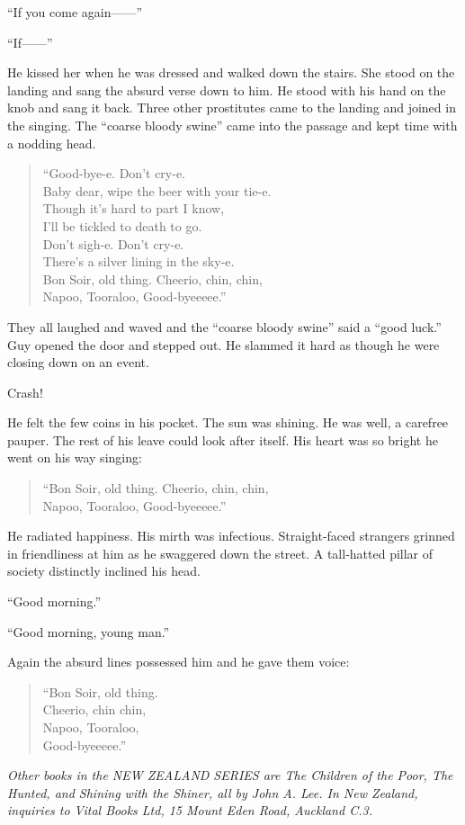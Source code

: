 ``If you come again------''

``If------''

He kissed her when he was dressed and walked down the stairs. She stood on the landing and sang the absurd verse down to him. He stood with his hand on the knob and sang it back. Three other prostitutes came to the landing and joined in the singing. The ``coarse bloody swine'' came into the passage and kept time with a nodding head.

\begin{verse}
``Good-bye-e. Don't cry-e.\\
Baby dear, wipe the beer with your tie-e.\\
Though it's hard to part I know,\\
I'll be tickled to death to go.\\
Don't sigh-e. Don't cry-e.\\
There's a silver lining in the sky-e.\\
Bon Soir, old thing. Cheerio, chin, chin,\\
Napoo, Tooraloo, Good-byeeeee.''\\
\end{verse}

They all laughed and waved and the ``coarse bloody swine'' said a ``good luck.'' Guy opened the door and stepped out. He slammed it hard as though he were closing down on an event.

Crash!

He felt the few coins in his pocket. The sun was shining. He was well, a carefree pauper. The rest of his leave could look after itself. His heart was so bright he went on his way singing:

\begin{verse}
``Bon Soir, old thing. Cheerio, chin, chin,\\
Napoo, Tooraloo, Good-byeeeee.''\\
\end{verse}

He radiated happiness. His mirth was infectious. Straight-faced strangers grinned in friendliness at him as he swaggered down the street. A tall-hatted pillar of society distinctly inclined his head.

``Good morning.''

``Good morning, young man.''

Again the absurd lines possessed him and he gave them voice:

\begin{verse}
``Bon Soir, old thing.\\
Cheerio, chin chin,\\
Napoo, Tooraloo,\\
Good-byeeeee.''\\
\end{verse}

\begin{flushright}
\textit{Other books in the NEW ZEALAND SERIES are The Children of the Poor, The Hunted, and Shining with the Shiner, all by John A. Lee. In New Zealand, inquiries to Vital Books Ltd, 15 Mount Eden Road, Auckland C.3.}
\end{flushright}